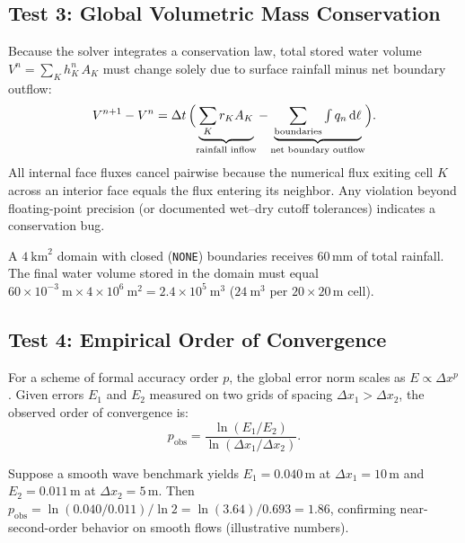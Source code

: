 \documentclass[11pt,a4paper]{article}
\newcommand{\dd}{\mathrm d}
\begin{document}
\subsection{Test 3: Global Volumetric Mass Conservation}

Because the solver integrates a conservation law, total stored water volume $V^n=\sum_K h_K^n\,A_K$ must change solely due to surface rainfall minus net boundary outflow:
\begin{equation}
  V^{n+1}-V^{n}=\Delta t\,\Bigl(\underbrace{\sum_K r_K A_K}_{\text{rainfall inflow}}
  -\underbrace{\sum_{\text{boundaries}}\textstyle\int q_n\,\dd\ell}_{\text{net boundary outflow}}\Bigr).
  \label{eq:balance}
\end{equation}
All internal face fluxes cancel pairwise because the numerical flux exiting cell $K$ across an interior face equals the flux entering its neighbor. Any violation beyond floating-point precision (or documented wet--dry cutoff tolerances) indicates a conservation bug.

\begin{ejemplo}
A $4\ \mathrm{km}^2$ domain with closed (\texttt{NONE}) boundaries receives $60$\,mm of total rainfall. The final water volume stored in the domain must equal $60\times10^{-3}\ \mathrm{m}\times4\times10^{6}\ \mathrm{m}^2=2.4\times10^{5}\ \mathrm{m}^3$ ($24\ \mathrm{m}^3$ per $20\times20$\,m cell).
\end{ejemplo}

\subsection{Test 4: Empirical Order of Convergence}

For a scheme of formal accuracy order $p$, the global error norm scales as $E\propto\Delta x^{p}$. Given errors $E_1$ and $E_2$ measured on two grids of spacing $\Delta x_1>\Delta x_2$, the observed order of convergence is:
\begin{equation}
  p_{\text{obs}}=\frac{\ln(E_1/E_2)}{\ln(\Delta x_1/\Delta x_2)} .
  \label{eq:orden}
\end{equation}

\begin{ejemplo}
Suppose a smooth wave benchmark yields $E_1=0.040$\,m at $\Delta x_1=10$\,m and $E_2=0.011$\,m at $\Delta x_2=5$\,m. Then
$p_{\text{obs}}=\ln(0.040/0.011)/\ln2=\ln(3.64)/0.693=1.86$,
confirming near-second-order behavior on smooth flows (illustrative numbers).
\end{ejemplo}
\end{document}
